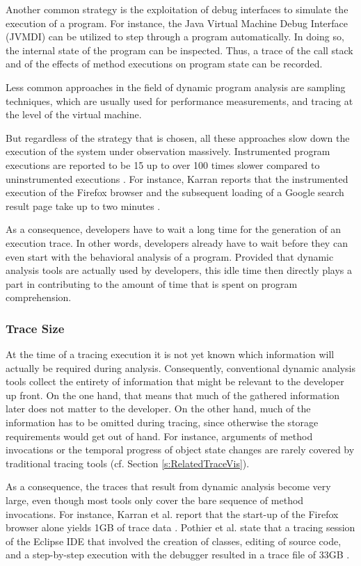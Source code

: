 Another common strategy is the exploitation of debug interfaces to simulate the execution of a program.
For instance, the Java Virtual Machine Debug Interface (JVMDI) can be utilized to step through a program automatically.
In doing so, the internal state of the program can be inspected.
Thus, a trace of the call stack and of the effects of method executions on program state can be recorded.

Less common approaches in the field of dynamic program analysis are sampling techniques, which are usually used for performance measurements, and tracing at the level of the virtual machine.

But regardless of the strategy that is chosen, all these approaches slow down the execution of the system under observation massively.
Instrumented program executions are reported to be 15 up to over 100 times slower compared to uninstrumented executions \cite{pothier_scalable_2007, karran_synctrace:_2013}.
For instance, Karran reports that the instrumented execution of the Firefox browser and the subsequent loading of a Google search result page take up to two minutes \cite{karran_extraction_2013}.

As a consequence, developers have to wait a long time for the generation of an execution trace.
In other words, developers already have to wait before they can even start with the behavioral analysis of a program.
Provided that dynamic analysis tools are actually used by developers, this idle time then directly plays a part in contributing to the amount of time that is spent on program comprehension.

\subsubsection{Trace Size}
At the time of a tracing execution it is not yet known which information will actually be required during analysis.
Consequently, conventional dynamic analysis tools collect the entirety of information that might be relevant to the developer up front.
On the one hand, that means that much of the gathered information later does not matter to the developer.
On the other hand, much of the information has to be omitted during tracing, since otherwise the storage requirements would get out of hand.
For instance, arguments of method invocations or the temporal progress of object state changes are rarely covered by traditional tracing tools (cf. Section \ref{s:RelatedTraceVis}).

As a consequence, the traces that result from dynamic analysis become very large, even though most tools only cover the bare sequence of method invocations.
For instance, Karran et al. report that the start-up of the Firefox browser alone yields 1GB of trace data \cite{karran_extraction_2013}.
Pothier et al. state that a tracing session of the Eclipse IDE that involved the creation of classes, editing of source code, and a step-by-step execution with the debugger resulted in a trace file of 33GB \cite{pothier_scalable_2007}.

